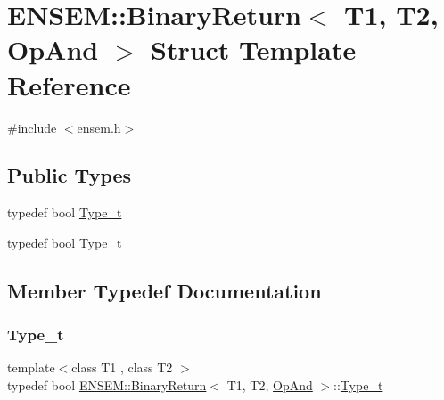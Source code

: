 \hypertarget{structENSEM_1_1BinaryReturn_3_01T1_00_01T2_00_01OpAnd_01_4}{}\section{E\+N\+S\+EM\+:\+:Binary\+Return$<$ T1, T2, Op\+And $>$ Struct Template Reference}
\label{structENSEM_1_1BinaryReturn_3_01T1_00_01T2_00_01OpAnd_01_4}


{\ttfamily \#include $<$ensem.\+h$>$}

\subsection*{Public Types}
\begin{DoxyCompactItemize}
\item 
typedef bool \mbox{\hyperlink{structENSEM_1_1BinaryReturn_3_01T1_00_01T2_00_01OpAnd_01_4_a1efceffe0a3869bf85b2fa8d9b578978}{Type\+\_\+t}}
\item 
typedef bool \mbox{\hyperlink{structENSEM_1_1BinaryReturn_3_01T1_00_01T2_00_01OpAnd_01_4_a1efceffe0a3869bf85b2fa8d9b578978}{Type\+\_\+t}}
\end{DoxyCompactItemize}


\subsection{Member Typedef Documentation}
\mbox{\label{structENSEM_1_1BinaryReturn_3_01T1_00_01T2_00_01OpAnd_01_4_a1efceffe0a3869bf85b2fa8d9b578978}} 
\subsubsection{\texorpdfstring{Type\_t}{Type\_t}\hspace{0.1cm}{\footnotesize\ttfamily [1/2]}}
{\footnotesize\ttfamily template$<$class T1 , class T2 $>$ \\
typedef bool \mbox{\hyperlink{structENSEM_1_1BinaryReturn}{E\+N\+S\+E\+M\+::\+Binary\+Return}}$<$ T1, T2, \mbox{\hyperlink{structENSEM_1_1OpAnd}{Op\+And}} $>$\+::\mbox{\hyperlink{structENSEM_1_1BinaryReturn_3_01T1_00_01T2_00_01OpAnd_01_4_a1efceffe0a3869bf85b2fa8d9b578978}{Type\+\_\+t}}}

